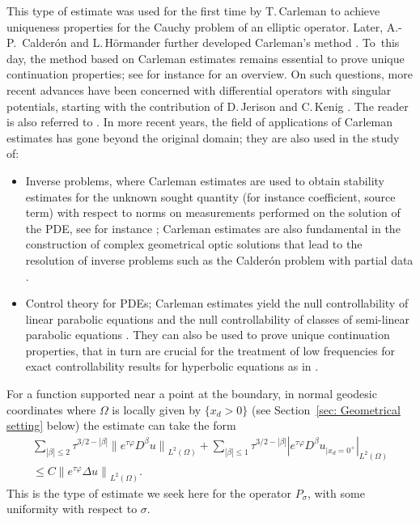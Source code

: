 \documentclass[JEP,XML,SOM,Unicode,published]{cedram}
\theoremstyle{plain}
\theoremstyle{definition}
\newcommand{\br}{\ensuremath{_{|x_d=0^+}}}
\newcommand{\Norm}[2]{{\| #1 \|}_{#2}}
\newcommand{\norm}[2]{{|#1|}_{#2}}
\newcommand{\Psig}{P_{\sigma}}
\begin{document}
This type of estimate was used for the first time by T.\,Carleman
\cite{Carleman:39} to achieve uniqueness properties for the Cauchy
problem of an elliptic operator. Later, A.\nobreakdash-P.\ Calderón and
L.\,Hörmander further developed Carleman's method
\cite{Calderon:58,Hoermander:58}. To~this day, the method based on Carleman estimates
remains essential to prove unique continuation properties;
see for instance \cite{Zuily:83} for an overview. On such questions,
more recent advances have been concerned with differential operators
with singular potentials, starting with the contribution of D.\,Jerison
and C.\,Kenig \cite{JK:85}. The reader is also referred to \cite{Sogge:89,KT:01,KT:02,DDSF:05,KT:05}.
In more recent years, the field of applications of Carleman estimates
has gone beyond the original domain; they are also used in the study
of:
\begin{itemize}
\item Inverse problems, where Carleman estimates are used to obtain
stability estimates for the unknown sought quantity (for instance
coefficient, source term) with respect to norms on measurements
performed on the solution of the PDE, see for instance
\cite{BK:81,Isakov:98,Kubo:00,IIY:03}; Carleman estimates are also
fundamental in the construction of complex geometrical optic solutions
that lead to the resolution of inverse problems such as the Calderón
problem with partial data \cite{KSU:07,DKSU:09}.

\item Control theory for PDEs; Carleman estimates yield the null controllability of linear parabolic equations
\cite{LR:95} and the null controllability of classes of semi-linear
parabolic equations \cite{FI:96,Barbu:00,FZ:00}.
They can also be used to prove unique continuation properties, that in
turn are crucial for the treatment of low frequencies for exact
controllability results for hyperbolic equations as in \cite{BLR:92}.
\end{itemize}

For a function supported near a point at the boundary, in normal geodesic coordinates where $\Omega$ is locally given by $\{
x_d >0\}$ (see Section~\ref{sec:
Geometrical setting} below) the estimate
can take the form
\begin{multline*}
\sum_{|\beta|\leq 2} \tau^{3/2-|\beta|}
\Norm{e^{\tau\varphi} D^\beta u}{L^2(\Omega)}
+ \sum_{|\beta|\leq 1} \tau^{3/2-|\beta|}
\norm{e^{\tau\varphi} D^\beta u\br}{L^2(\Omega)}\\
\leq C \Norm{e^{\tau\varphi} \Delta u}{L^2(\Omega)}.
\end{multline*}
This is the type of estimate we seek here for the operator $\Psig$,
with some uniformity with respect to $\sigma$.
\end{document}
